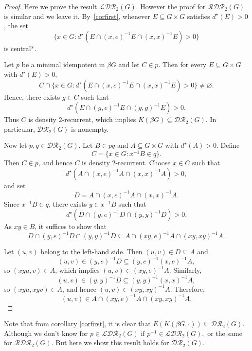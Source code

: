 \documentclass{article}
\theoremstyle{Theorem}
\theoremstyle{definition}
\begin{document}
\begin{proof} Here we prove the result $\mathcal{LDR}_2(G).$ However the proof for  $\mathcal{RDR}_2(G)$ is similar and we leave it.
By~\ref{corfirst}, whenever
$E \subseteq G \times G$ satisfies $d^\star(E) > 0$, the set
\[
\{ x \in G : d^\star(E \cap (x,e)^{-1}E \cap (x,x)^{-1}E) > 0 \}
\]
is central*.

Let $p$ be a minimal idempotent in $\beta G$ and let $C \in p$. Then for every
$E \subseteq G \times G$ with $d^\star(E) > 0$,
\[
C \cap \{ x \in G : d^\star(E \cap (x,e)^{-1}E \cap (x,x)^{-1}E) > 0 \} \neq \varnothing.
\]
Hence, there exists $g \in C$ such that
\[
d^\star(E \cap (g,e)^{-1}E \cap (g,g)^{-1}E) > 0.
\]
Thus $C$ is density $2$-recurrent, which implies
$K(\beta G) \subseteq \mathcal{DR}_2(G)$. In particular,
$\mathcal{DR}_2(G)$ is nonempty.

Now let $p,q \in \mathcal{DR}_2(G)$. Let $B \in pq$ and
$A \subseteq G \times G$ with $d^\star(A) > 0$. Define
\[
C = \{ x \in G : x^{-1}B \in q \}.
\]
Then $C \in p$, and hence $C$ is density $2$-recurrent. Choose $x \in C$ such that
\[
d^\star(A \cap (x,e)^{-1}A \cap (x,x)^{-1}A) > 0,
\]
and set
\[
D = A \cap (x,e)^{-1}A \cap (x,x)^{-1}A.
\]
Since $x^{-1}B \in q$, there exists $y \in x^{-1}B$ such that
\[
d^\star(D \cap (y,e)^{-1}D \cap (y,y)^{-1}D) > 0.
\]
As $xy \in B$, it suffices to show that
\[
D \cap (y,e)^{-1}D \cap (y,y)^{-1}D
\subseteq
A \cap (xy,e)^{-1}A \cap (xy,xy)^{-1}A.
\]

Let $(u,v)$ belong to the left-hand side. Then $(u,v) \in D \subseteq A$ and
\[
(u,v) \in (y,e)^{-1}D \subseteq (y,e)^{-1}(x,e)^{-1}A,
\]
so $(xyu,v) \in A$, which implies $(u,v) \in (xy,e)^{-1}A$.
Similarly,
\[
(u,v) \in (y,y)^{-1}D \subseteq (y,y)^{-1}(x,x)^{-1}A,
\]
so $(xyu,xyv) \in A$, and hence $(u,v) \in (xy,xy)^{-1}A$.
Therefore,
\[
(u,v) \in A \cap (xy,e)^{-1}A \cap (xy,xy)^{-1}A.
\]
\end{proof}

Note that from corollary \ref{corfirst}, it is clear that $E(K(\beta G,\cdot ))\subseteq \mathcal{DR}_2(G).$
Although we don't know for $p\in \mathcal{LDR}_2(G)$ if $p^{-1}\in \mathcal{LDR}_2(G),$ or the same for $ \mathcal{RDR}_2(G)$. But here we show this result holds for $\mathcal{DR}_2(G).$
\end{document}
